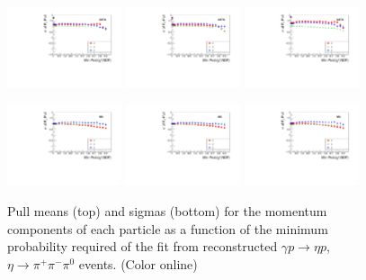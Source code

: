 \begin{figure}[tbp]
\begin{center}
\includegraphics[width=0.3\textwidth]{figures/gluex_nim_pullspx_pulls_sigma_data.pdf}
\includegraphics[width=0.3\textwidth]{figures/gluex_nim_pullspy_pulls_sigma_data.pdf}
\includegraphics[width=0.3\textwidth]{figures/gluex_nim_pullspz_pulls_sigma_data.pdf}

\includegraphics[width=0.3\textwidth]{figures/gluex_nim_pullspx_pulls_sigma_mc.pdf}
\includegraphics[width=0.3\textwidth]{figures/gluex_nim_pullspy_pulls_sigma_mc.pdf}
\includegraphics[width=0.3\textwidth]{figures/gluex_nim_pullspz_pulls_sigma_mc.pdf}

\caption{\label{fig:kinfitstudy}
Pull means (top) and sigmas (bottom) for the momentum components of each particle as a function of the minimum probability required of the fit from reconstructed $\gamma p \to \eta p$,  $\eta \to \pi^+\pi^-\pi^0$ events.
 (Color online)}
\end{center}  
\end{figure}

